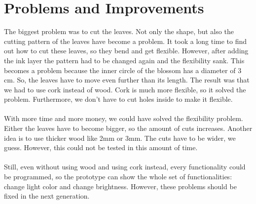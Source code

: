 \documentclass[00_doc.tex]{subfiles}
\begin{document}
    \section{Problems and Improvements}
    \begin{flushleft}
        The biggest problem was to cut the leaves. Not only the shape, but also the cutting pattern 
        of the leaves have become a problem. It took a long time to find out how to cut these leaves,
        so they bend and get flexible. However, after adding the ink layer the pattern had to be changed
        again and the flexibility sank. This becomes a problem because the inner circle of the blossom 
        has a diameter of 3 cm. So, the leaves have to move even further than its length. 
        The result was that we had to use cork instead of wood. Cork is much more flexible, so it 
        solved the problem. Furthermore, we don't have to cut holes inside to make it flexible. \\~\\
        
        With more time and more money, we could have solved the flexibility problem. Either the leaves 
        have to become bigger, so the amount of cuts increases. Another idea is to use thicker wood
        like 2mm or 3mm. The cuts have to be wider, we guess. However, this could not be tested in 
        this amount of time.\\~\\
        
        Still, even without using wood and using cork instead, every functionality could be 
        programmed, so the prototype can show the whole set of functionalities: change light color 
        and change brightness. However, these problems should be fixed in the next generation.
    \end{flushleft}
\end{document}

